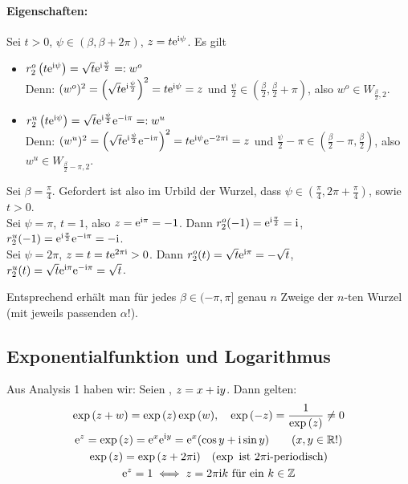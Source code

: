 \documentclass[a4paper,twoside,DIV15,BCOR12mm]{scrbook}
\begin{document}
\paragraph{Eigenschaften:} Sei $t>0$, $\psi\in(\beta,\beta+2\pi)$, $z=t\mathrm{e}^{\mathrm{i}\psi}$. Es gilt
\begin{itemize}
\item $r_2^o\left(t\mathrm{e}^{\mathrm{i}\psi}\right) = \sqrt{t}\mathrm{e}^{\mathrm{i}\frac\psi2} =: w^o$\\
  Denn: $(w^o)^2 = \left(\sqrt{t}\mathrm{e}^{\mathrm{i}\frac\psi2}\right)^2 = t\mathrm{e}^{\mathrm{i}\psi} = z$ und $\frac\psi2 \in
  (\frac\beta2,\frac\beta2+\pi)$, also $w^o\in W_{\frac\beta2,2}$.
\item $r_2^u\left(t\mathrm{e}^{\mathrm{i}\psi}\right) = \sqrt{t}\mathrm{e}^{\mathrm{i}\frac\psi2}\mathrm{e}^{-\mathrm{i}\pi} =: w^u$\\
  Denn: $(w^u)^2 = \left(\sqrt{t}\mathrm{e}^{\mathrm{i}\frac\psi2}\mathrm{e}^{-\mathrm{i}\pi}\right)^2 = t\mathrm{e}^{\mathrm{i}\psi}\mathrm{e}^{-2\pi\mathrm{i}} = z$ und $\frac\psi2-\pi \in
  (\frac\beta2-\pi,\frac\beta2)$, also $w^u\in W_{\frac\beta2-\pi,2}$.
\end{itemize}

\begin{bsp*}
  Sei $\beta=\frac\pi4$. Gefordert ist also im Urbild der Wurzel, dass $\psi\in(\frac\pi4,2\pi+\frac\pi4)$, sowie $t>0$.\\
  Sei $\psi=\pi$, $t=1$, also $z=\mathrm{e}^{\mathrm{i}\pi}=-1$. Dann $r^o_2(-1)=\mathrm{e}^{\mathrm{i}\frac\pi2}=\mathrm{i}$,
  $r^u_2(-1)=\mathrm{e}^{\mathrm{i}\frac\pi2}\mathrm{e}^{-\mathrm{i}\pi}=-\mathrm{i}$. \\
  Sei $\psi=2\pi$, $z=t=t\mathrm{e}^{2\pi\mathrm{i}}>0$. Dann $r^o_2(t) = \sqrt{t}\mathrm{e}^{\mathrm{i}\pi} = -\sqrt{t}$, $r^u_2(t) =
  \sqrt{t}\mathrm{e}^{\mathrm{i}\pi}\mathrm{e}^{-\mathrm{i}\pi} = \sqrt{t}$.
\end{bsp*}

\noindent Entsprechend erhält man für jedes $\beta\in(-\pi,\pi]$ genau $n$ Zweige der $n$-ten Wurzel (mit jeweils passenden $\alpha$!).


\subsection{Exponentialfunktion und Logarithmus}

Aus Analysis 1 haben wir: Seien , $z=x+\mathrm{i} y$. Dann gelten:
\begin{gather}
  \exp{(z+w)}=\exp{(z)}\exp{(w)}, \quad \exp{(-z)} = \frac{1}{\exp{(z)}} \neq 0 \label{1.6} \\
  \mathrm{e}^z = \exp{(z)} = \mathrm{e}^x\mathrm{e}^{\mathrm{i} y} = \mathrm{e}^x(\cos{y}+\mathrm{i}\sin{y}) \quad \quad (x,y\in\mathbb{R}!) \label{1.7} \\
  \exp{(z)} = \exp{(z+2\pi\mathrm{i})} \quad (\exp \text{ ist } 2\pi\mathrm{i}\text{-periodisch}) \label{1.8} \\
  \mathrm{e}^z=1 \iff z=2\pi\mathrm{i} k \text{ für ein } k\in\mathbb{Z} \label{eqn1.9}
\end{gather}
\end{document}
